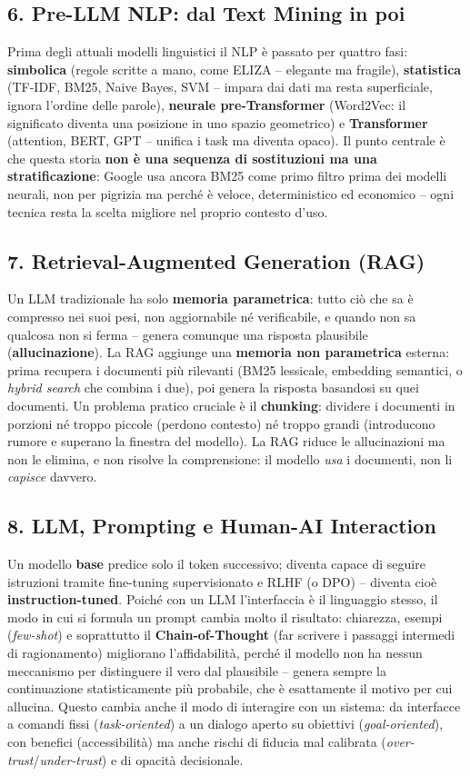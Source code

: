 \documentclass[11pt,a4paper]{article}
\begin{document}
\subsection*{6. Pre-LLM NLP: dal Text Mining in poi}
Prima degli attuali modelli linguistici il NLP \`e passato per quattro fasi: \textbf{simbolica} (regole scritte a mano, come ELIZA -- elegante ma fragile), \textbf{statistica} (TF-IDF, BM25, Naive Bayes, SVM -- impara dai dati ma resta superficiale, ignora l'ordine delle parole), \textbf{neurale pre-Transformer} (Word2Vec: il significato diventa una posizione in uno spazio geometrico) e \textbf{Transformer} (attention, BERT, GPT -- unifica i task ma diventa opaco). Il punto centrale \`e che questa storia \textbf{non \`e una sequenza di sostituzioni ma una stratificazione}: Google usa ancora BM25 come primo filtro prima dei modelli neurali, non per pigrizia ma perch\'e \`e veloce, deterministico ed economico -- ogni tecnica resta la scelta migliore nel proprio contesto d'uso.

\subsection*{7. Retrieval-Augmented Generation (RAG)}
Un LLM tradizionale ha solo \textbf{memoria parametrica}: tutto ci\`o che sa \`e compresso nei suoi pesi, non aggiornabile n\'e verificabile, e quando non sa qualcosa non si ferma -- genera comunque una risposta plausibile (\textbf{allucinazione}). La RAG aggiunge una \textbf{memoria non parametrica} esterna: prima recupera i documenti pi\`u rilevanti (BM25 lessicale, embedding semantici, o \emph{hybrid search} che combina i due), poi genera la risposta basandosi su quei documenti. Un problema pratico cruciale \`e il \textbf{chunking}: dividere i documenti in porzioni n\'e troppo piccole (perdono contesto) n\'e troppo grandi (introducono rumore e superano la finestra del modello). La RAG riduce le allucinazioni ma non le elimina, e non risolve la comprensione: il modello \emph{usa} i documenti, non li \emph{capisce} davvero.

\subsection*{8. LLM, Prompting e Human-AI Interaction}
Un modello \textbf{base} predice solo il token successivo; diventa capace di seguire istruzioni tramite fine-tuning supervisionato e RLHF (o DPO) -- diventa cio\`e \textbf{instruction-tuned}. Poich\'e con un LLM l'interfaccia \`e il linguaggio stesso, il modo in cui si formula un prompt cambia molto il risultato: chiarezza, esempi (\emph{few-shot}) e soprattutto il \textbf{Chain-of-Thought} (far scrivere i passaggi intermedi di ragionamento) migliorano l'affidabilit\`a, perch\'e il modello non ha nessun meccanismo per distinguere il vero dal plausibile -- genera sempre la continuazione statisticamente pi\`u probabile, che \`e esattamente il motivo per cui allucina. Questo cambia anche il modo di interagire con un sistema: da interfacce a comandi fissi (\emph{task-oriented}) a un dialogo aperto su obiettivi (\emph{goal-oriented}), con benefici (accessibilit\`a) ma anche rischi di fiducia mal calibrata (\emph{over-trust}/\emph{under-trust}) e di opacit\`a decisionale.
\end{document}
